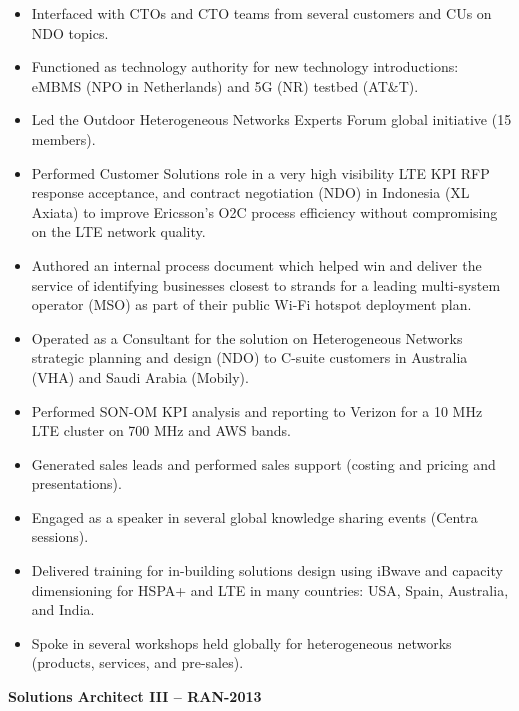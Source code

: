 \documentclass{article}
\begin{document}
\begin{itemize}
\item Interfaced with CTOs and CTO teams from several customers and CUs on NDO topics. 
\item Functioned as technology authority for new technology introductions: eMBMS (NPO in Netherlands) and 5G (NR) testbed (AT\&T). 
\item Led the Outdoor Heterogeneous Networks Experts Forum global initiative (15 members). 
\item Performed Customer Solutions role in a very high visibility LTE KPI RFP response acceptance, and contract negotiation (NDO) in Indonesia (XL Axiata) to improve Ericsson's O2C process efficiency without compromising on the LTE network quality. 
\item Authored an internal process document which helped win and deliver the service of identifying businesses closest to strands for a leading multi-system operator (MSO) as part of their public Wi-Fi hotspot deployment plan. 
\item Operated as a Consultant for the solution on Heterogeneous Networks strategic planning and design (NDO) to C-suite customers in Australia (VHA) and Saudi Arabia (Mobily). 
\item Performed SON-OM KPI analysis and reporting to Verizon for a 10 MHz LTE cluster on 700 MHz and AWS bands. 
\item Generated sales leads and performed sales support (costing and pricing and presentations). 
\item Engaged as a speaker in several global knowledge sharing events (Centra sessions). 
\item Delivered training for in-building solutions design using iBwave and capacity dimensioning for HSPA+ and LTE in many countries: USA, Spain, Australia, and India. 
\item Spoke in several workshops held globally for heterogeneous networks (products, services, and pre-sales). 
\end{itemize}
\textbf{Solutions Architect III -- RAN\hfill{}-2013}
\end{document}
